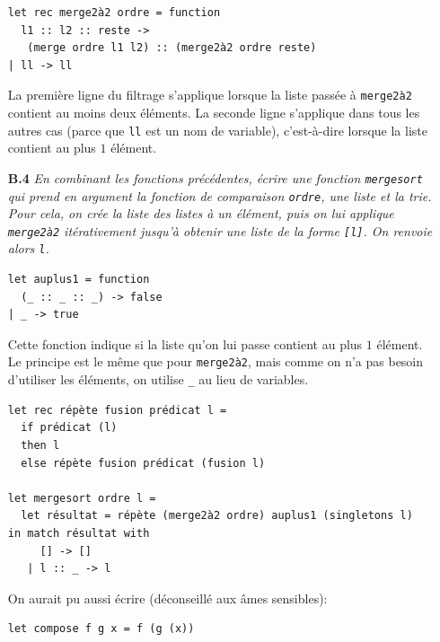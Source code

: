 \documentclass[11pt, a4paper]{article}
\begin{document}
\begin{itemize}
      \smallskip

\begin{verbatim}
let rec merge2à2 ordre = function
  l1 :: l2 :: reste ->
   (merge ordre l1 l2) :: (merge2à2 ordre reste)
| ll -> ll
\end{verbatim}

      La première ligne du filtrage s'applique lorsque la liste passée
      à \verb+merge2à2+ contient au moins deux éléments. La seconde
      ligne s'applique dans tous les autres cas (parce que {\tt ll}
      est un nom de variable), c'est-à-dire lorsque la liste contient
      au plus $1$ élément.

      \smallskip

  \item[\textbf{B.4}] \emph{En combinant les fonctions précédentes,
      écrire une fonction {\tt mergesort} qui prend en argument la
      fonction de comparaison \texttt{ordre}, une liste et la
      trie. Pour cela, on crée la liste des listes à un élément, puis
      on lui applique {\tt merge2à2} itérativement jusqu'à obtenir une
      liste de la forme \texttt{[l]}. On renvoie alors \texttt{l}.}

      \smallskip

      \begin{verbatim}
let auplus1 = function
  (_ :: _ :: _) -> false
| _ -> true
      \end{verbatim}

      Cette fonction indique si la liste qu'on lui passe contient au
      plus $1$ élément. Le principe est le même que pour
      \verb+merge2à2+, mais comme on n'a pas besoin d'utiliser les
      éléments, on utilise \verb+_+ au lieu de variables.

      \smallskip

{\small
      \begin{verbatim}
let rec répète fusion prédicat l =
  if prédicat (l)
  then l
  else répète fusion prédicat (fusion l)

let mergesort ordre l =
  let résultat = répète (merge2à2 ordre) auplus1 (singletons l)
in match résultat with
     [] -> []
   | l :: _ -> l
      \end{verbatim}
}

      \smallskip

      On aurait pu aussi écrire (déconseillé aux âmes sensibles):

      \smallskip

{\small
      \begin{verbatim}
let compose f g x = f (g (x))


\end{verbatim}}
\end{itemize}
\end{document}
